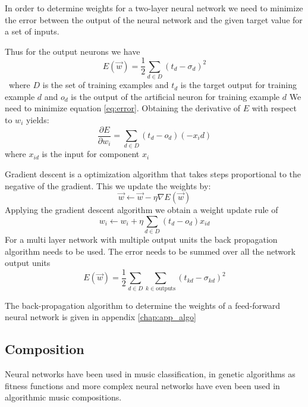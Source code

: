 In order to determine weights for a two-layer neural network we need to minimize the error between the output of the neural network and the given target value for a set of inputs. 

Thus for the output neurons we have
\begin{equation} E(\vec{w}) = \frac{1}{2} \sum_{d \in D}(t_d - \sigma_d)^2 \label{eq:error} \end{equation}\
where $D$ is the set of training examples and $t_d$ is the target output for training example $d$ and $o_d$ is the output of the artificial neuron for training example $d$
We need to minimize equation \ref{eq:error}.
Obtaining the derivative of $E$ with respect to $w_i$ yields:
\[ \frac{\partial E}{\partial w_i} = \sum_{d\in D}(t_d - o_d)(-x_id) \]
where $x_{id}$ is the input for component $x_i$

Gradient descent is a optimization algorithm that takes steps proportional to the negative of the gradient. This we update the weights by:
\[\vec{w} \leftarrow \vec{w} - \eta \nabla E(\vec{w}) \]
Applying the gradient descent algorithm we obtain a weight update rule of
\[ w_i \leftarrow w_i + \eta \sum_{d \in D} (t_d - o_d) x_{id} \]
For a multi layer network with multiple output units the back propagation algorithm needs to be used.
The error needs to be summed over all the network output units
\[E(\vec{w}) = \frac{1}{2} \sum_{d \in D} \sum_{k \in \text{outputs}} (t_{kd} - \sigma_{kd})^2 \]

The back-propagation algorithm to determine the weights of a feed-forward neural network is given in appendix \ref{chap:app_algo}


\subsection{Composition}
Neural networks have been used in music classification, in genetic algorithms as fitness functions and more complex neural networks have even been used in algorithmic music compositions.

